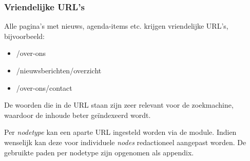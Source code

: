 \subsubsection{Vriendelijke URL's}
Alle pagina's met nieuws, agenda-items etc. krijgen vriendelijke URL's, bijvoorbeeld:

\begin{itemize}
  \item /over-ons
  \item /nieuwsberichten/overzicht
  \item /over-ons/contact
\end{itemize}

De woorden die in de URL staan zijn zeer relevant voor de zoekmachine, waardoor de inhoude beter ge\"indexeerd wordt.

Per \textit{nodetype} kan een aparte URL ingesteld worden via de  module. Indien wenselijk kan deze voor individuele \textit{nodes} redactioneel aangepast worden. De gebruikte paden per nodetype zijn opgenomen als appendix.